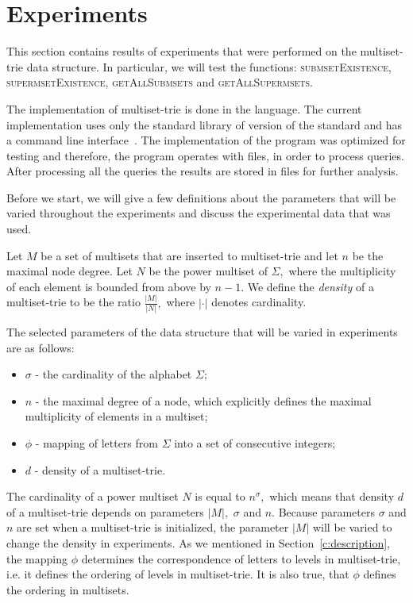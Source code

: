 \section{Experiments} \label{c:experiments}

%
This section contains results of experiments that were performed on the multiset-trie 
data structure. In particular, we will test the functions: \textsc{submsetExistence}, 
\textsc{supermsetExistence}, \textsc{getAllSubmsets} and \textsc{getAllSupermsets}. 

The implementation of multiset-trie is done in the  language. 
The current implementation uses only the standard library of  version of the 
standard and has a command line interface~\cite{akulich2019mstrie}. The implementation of the program was 
optimized for testing and therefore, the program operates with files, in order to 
process queries. After processing all the queries the results are stored in files for further analysis.


Before we start, we will give a few definitions about the parameters 
that will be varied throughout the experiments and discuss the experimental data 
that was used.

Let $M$ be a set of multisets that are inserted to multiset-trie and let $n$ be 
the maximal node degree. Let $N$ be the power multiset of $\Sigma,$ where 
the multiplicity of each element is bounded from above by $n-1.$ We define the 
\emph{density} of a multiset-trie to be the ratio $\frac{|M|}{|N|},$ where 
$|\cdot|$ denotes cardinality.

The selected parameters of the data structure that will be varied in experiments 
are as follows:
%
\begin{itemize}
\item $\sigma$ - the cardinality of the alphabet $\Sigma;$
%
\item $n$ - the maximal degree of a node, which explicitly defines the maximal 
multiplicity of elements in a multiset;
%
\item $\phi$ - mapping of letters from $\Sigma$ into a set of consecutive 
integers;
%
\item $d$ - density of a multiset-trie.
%
\end{itemize}
The cardinality of a power multiset $N$ is equal to $n^\sigma,$ which means that 
density $d$ of a multiset-trie depends on parameters $|M|,$ $\sigma$ and $n.$ 
Because parameters $\sigma$ and $n$ are set when a multiset-trie is initialized, 
the parameter $|M|$ will be varied to change the density in experiments. As we 
mentioned in Section~\ref{c:description}, the mapping $\phi$ determines the 
correspondence of letters to levels in multiset-trie, i.e. it defines the ordering of 
levels in multiset-trie. It is also true, that $\phi$ defines the ordering in multisets.

